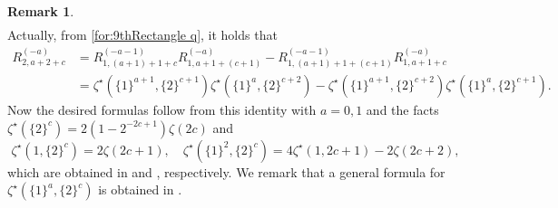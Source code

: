 \documentclass[12pt]{amsart}%
\theoremstyle{definition}
\newtheorem{remark}[theorem]{Remark}
\begin{document}
\begin{remark}
\begin{align*}
\end{align*}
Actually, from \eqref{for:9thRectangle q}, 
it holds that 
\begin{align*}
R^{(-a)}_{2,a+2+c}
&=R^{(-a-1)}_{1,(a+1)+1+c}R^{(-a)}_{1,a+1+(c+1)}
-R^{(-a-1)}_{1,(a+1)+1+(c+1)}R^{(-a)}_{1,a+1+c}\\
&=\zeta^{\star}(\{1\}^{a+1},\{2\}^{c+1})
\zeta^{\star}(\{1\}^a,\{2\}^{c+2})
-\zeta^{\star}(\{1\}^{a+1},\{2\}^{c+2})
\zeta^{\star}(\{1\}^{a},\{2\}^{c+1}).
\end{align*}
Now the desired formulas follow from this identity 
with $a=0,1$ and the facts
$\zeta^{\star}(\{2\}^{c})=2(1-2^{-2c+1})\zeta(2c)$
and 
\[
\zeta^{\star}(1,\{2\}^{c})
=2\zeta(2c+1),\quad 
\zeta^{\star}(\{1\}^2,\{2\}^c)
=4\zeta^{\star}(1,2c+1)-2\zeta(2c+2),
\]
which are obtained in \cite{zl05} and \cite[Lemma~5]{oz08}, respectively.
We remark that a general formula for 
$\zeta^{\star}(\{1\}^{a},\{2\}^{c})$
is obtained in \cite[Theorem~1.3]{ce23}.





\end{remark}
\end{document}
